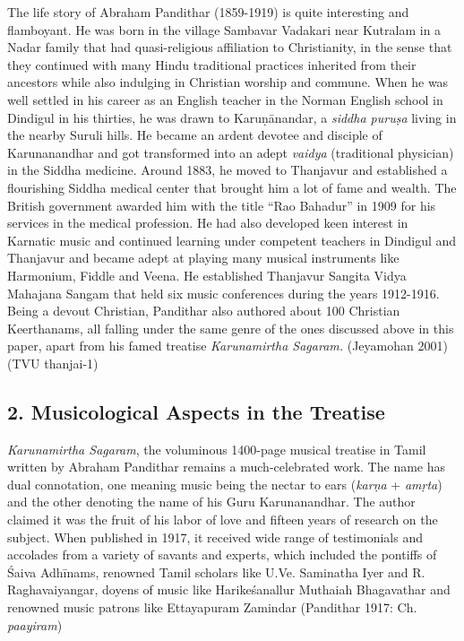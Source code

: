 The life story of Abraham Pandithar (1859-1919) is quite interesting and flamboyant. He was born in the village Sambavar Vadakari near Kutralam in a Nadar family that had quasi-religious affiliation to Christianity, in the sense that they continued with many Hindu traditional practices inherited from their ancestors while also indulging in Christian worship and commune. When he was well settled in his career as an English teacher in the Norman English school in Dindigul in his thirties, he was drawn to Karuṇānandar, a \textit{siddha puruṣa} living in the nearby Suruli hills. He became an ardent devotee and disciple of Karunanandhar and got transformed into an adept \textit{vaidya} (traditional physician) in the Siddha medicine. Around 1883, he moved to Thanjavur and established a flourishing Siddha medical center that brought him a lot of fame and wealth. The British government awarded him with the title “Rao Bahadur” in 1909 for his services in the medical profession. He had also developed keen interest in Karnatic music and continued learning under competent teachers in Dindigul and Thanjavur and became adept at playing many musical instruments like Harmonium, Fiddle and Veena. He established Thanjavur Sangita Vidya Mahajana Sangam that held six music conferences during the years 1912-1916. Being a devout Christian, Pandithar also authored about 100 Christian Keerthanams, all falling under the same genre of the ones discussed above in this paper, apart from his famed treatise \textit{Karunamirtha Sagaram. }(Jeyamohan 2001) (TVU thanjai-1)

\vspace{-.2cm}

\subsection*{2. Musicological Aspects in the Treatise}

\vspace{-.2cm}

\textit{Karunamirtha Sagaram}, the voluminous 1400-page musical treatise in Tamil written by Abraham Pandithar remains a much-celebrated work. The name has dual connotation, one meaning music being the nectar to ears (\textit{karṇa} + \textit{amṛta}) and the other denoting the name of his Guru Karunanandhar. The author claimed it was the fruit of his labor of love and fifteen years of research on the subject. When published in 1917, it received wide range of testimonials and accolades from a variety of savants and experts, which included the pontiffs of Śaiva Adhīnams, renowned Tamil scholars like U.Ve. Saminatha Iyer and R. Raghavaiyangar, doyens of music like Harikeśanallur Muthaiah Bhagavathar and renowned music patrons like Ettayapuram Zamindar (Pandithar 1917: Ch. \textit{paayiram})

